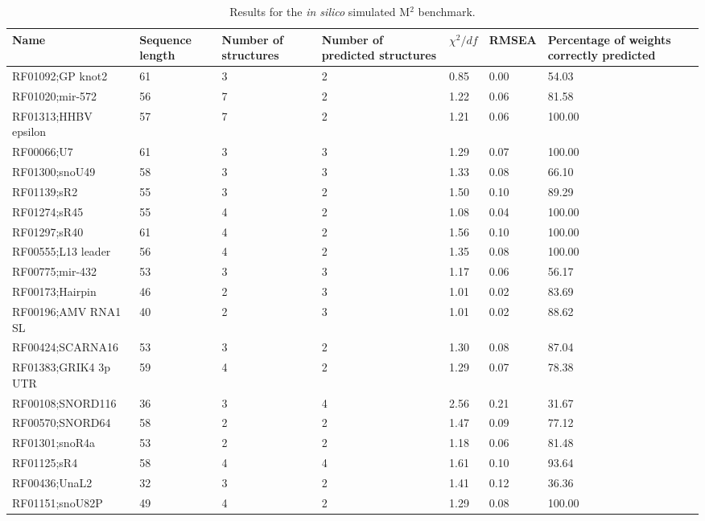 \documentclass[12pt]{article}
\begin{document}
\begin{table}[htbp]
\caption{Results for the \textit{in silico} simulated M$^2$ benchmark. }
\begin{tabular}{|l|p{0.5cm}|p{2cm}|p{2cm}|p{2cm}|p{2cm}|p{2cm}|}
\hline
Name & \multicolumn{1}{p{2cm}|}{Sequence length} & \multicolumn{1}{p{2cm}|}{Number of structures} & \multicolumn{1}{p{2cm}|}{Number of predicted structures} & \multicolumn{1}{p{2cm}|}{$\chi^2/df$} & \multicolumn{1}{p{2cm}|}{RMSEA} & \multicolumn{1}{p{2cm}|}{Percentage of weights correctly predicted} \\ \hline
RF01092;GP knot2 & 61 & 3 & 2 & 0.85 & 0.00 & 54.03 \\ \hline
RF01020;mir-572 & 56 & 7 & 2 & 1.22 & 0.06 & 81.58 \\ \hline
RF01313;HHBV epsilon & 57 & 7 & 2 & 1.21 & 0.06 & 100.00 \\ \hline
RF00066;U7 & 61 & 3 & 3 & 1.29 & 0.07 & 100.00 \\ \hline
RF01300;snoU49 & 58 & 3 & 3 & 1.33 & 0.08 & 66.10 \\ \hline
RF01139;sR2 & 55 & 3 & 2 & 1.50 & 0.10 & 89.29 \\ \hline
RF01274;sR45 & 55 & 4 & 2 & 1.08 & 0.04 & 100.00 \\ \hline
RF01297;sR40 & 61 & 4 & 2 & 1.56 & 0.10 & 100.00 \\ \hline
RF00555;L13 leader & 56 & 4 & 2 & 1.35 & 0.08 & 100.00 \\ \hline
RF00775;mir-432 & 53 & 3 & 3 & 1.17 & 0.06 & 56.17 \\ \hline
RF00173;Hairpin & 46 & 2 & 3 & 1.01 & 0.02 & 83.69 \\ \hline
RF00196;AMV RNA1 SL & 40 & 2 & 3 & 1.01 & 0.02 & 88.62 \\ \hline
RF00424;SCARNA16 & 53 & 3 & 2 & 1.30 & 0.08 & 87.04 \\ \hline
RF01383;GRIK4 3p UTR & 59 & 4 & 2 & 1.29 & 0.07 & 78.38 \\ \hline
RF00108;SNORD116 & 36 & 3 & 4 & 2.56 & 0.21 & 31.67 \\ \hline
RF00570;SNORD64 & 58 & 2 & 2 & 1.47 & 0.09 & 77.12 \\ \hline
RF01301;snoR4a & 53 & 2 & 2 & 1.18 & 0.06 & 81.48 \\ \hline
RF01125;sR4 & 58 & 4 & 4 & 1.61 & 0.10 & 93.64 \\ \hline
RF00436;UnaL2 & 32 & 3 & 2 & 1.41 & 0.12 & 36.36 \\ \hline
RF01151;snoU82P & 49 & 4 & 2 & 1.29 & 0.08 & 100.00 \\ \hline
\end{tabular}
\label{insilicobenchmark}
\end{table}
\end{document}

